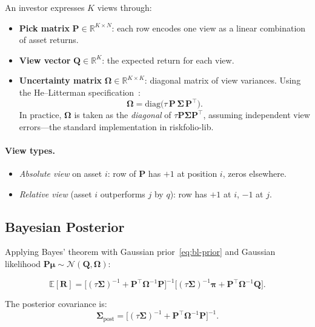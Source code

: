 \documentclass[12pt,a4paper]{article}
\newcommand{\E}{\mathbb{E}}
\newcommand{\R}{\mathbb{R}}
\begin{document}
An investor expresses $K$ views through:
\begin{itemize}[nosep]
    \item \textbf{Pick matrix} $\bm{P} \in \R^{K \times N}$: each row encodes one view as a linear combination of asset returns.
    \item \textbf{View vector} $\bm{Q} \in \R^K$: the expected return for each view.
    \item \textbf{Uncertainty matrix} $\bm{\Omega} \in \R^{K \times K}$: diagonal matrix of view variances. Using the He--Litterman specification~\cite{he1999}:
        \begin{equation}
            \bm{\Omega} = \text{diag}\bigl(\tau\,\bm{P}\,\bm{\Sigma}\,\bm{P}^\top\bigr).
            \label{eq:bl-omega}
        \end{equation}
        In practice, $\bm{\Omega}$ is taken as the \emph{diagonal} of $\tau\bm{P}\bm{\Sigma}\bm{P}^\top$, assuming independent view errors---the standard implementation in riskfolio-lib.
\end{itemize}

\paragraph{View types.}
\begin{itemize}[nosep]
    \item \emph{Absolute view} on asset $i$: row of $\bm{P}$ has $+1$ at position $i$, zeros elsewhere.
    \item \emph{Relative view} (asset $i$ outperforms $j$ by $q$): row has $+1$ at $i$, $-1$ at $j$.
\end{itemize}

\subsection{Bayesian Posterior}

Applying Bayes' theorem with Gaussian prior~\eqref{eq:bl-prior} and Gaussian likelihood $\bm{P\mu} \sim \mathcal{N}(\bm{Q}, \bm{\Omega})$:

\begin{equation}
\boxed{
    \E[\bm{R}] = \bigl[(\tau\bm{\Sigma})^{-1} + \bm{P}^\top\bm{\Omega}^{-1}\bm{P}\bigr]^{-1}
        \bigl[(\tau\bm{\Sigma})^{-1}\bm{\pi} + \bm{P}^\top\bm{\Omega}^{-1}\bm{Q}\bigr].
}
\label{eq:bl-posterior}
\end{equation}

The posterior covariance is:
\begin{equation}
    \bm{\Sigma}_{\text{post}} = \bigl[(\tau\bm{\Sigma})^{-1} + \bm{P}^\top\bm{\Omega}^{-1}\bm{P}\bigr]^{-1}.
    \label{eq:bl-postcov}
\end{equation}
\end{document}
